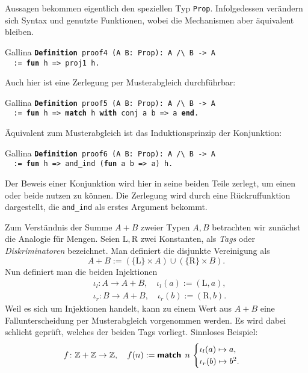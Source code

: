 \documentclass[8pt]{beamer}
\newcommand{\strong}[1]{\textsf{\textbf{#1}}}
\newcommand{\Z}{\mathbb Z}
\newcommand{\kw}[1]{\textbf{#1}}
\begin{document}
\begin{frame}
Aussagen bekommen eigentlich den speziellen Typ \texttt{Prop}.
Infolgedessen verändern sich Syntax und genutzte Funktionen,
wobei die Mechanismen aber äquivalent bleiben.
\begin{block}{Gallina}
\texttt{\kw{Definition} proof4 (A B: Prop): A /{\textbackslash} B -> A\\
\ \ := \kw{fun} h => proj1 h.}
\end{block}\pause
Auch hier ist eine Zerlegung per Musterabgleich durchführbar:
\begin{block}{Gallina}
\texttt{\kw{Definition} proof5 (A B: Prop): A /{\textbackslash} B -> A\\
\ \ := \kw{fun} h => \kw{match} h \kw{with} conj a b => a \kw{end}.}
\end{block}\pause
Äquivalent zum Musterabgleich ist das Induktionsprinzip der Konjunktion:
\begin{block}{Gallina}
\texttt{\kw{Definition} proof6 (A B: Prop): A /{\textbackslash} B -> A\\
\ \ := \kw{fun} h => and\_ind (\kw{fun} a b => a) h.}
\end{block}
Der Beweis einer Konjunktion wird hier in seine beiden Teile zerlegt,
um einen oder beide nutzen zu können. Die Zerlegung wird durch eine
Rückruffunktion dargestellt, die \texttt{and\_ind} als erstes Argument
bekommt.
\end{frame}

\begin{frame}
Zum Verständnis der Summe $A+B$ zweier Typen $A,B$ betrachten wir
zunächst die Analogie für Mengen. Seien $\mathrm L,\mathrm R$
zwei Konstanten, als \emph{Tags} oder \emph{Diskriminatoren} bezeichnet.
Man definiert die disjunkte Vereinigung als
\[A+B := (\{\mathrm L\}\times A)\cup (\{\mathrm R\}\times B).\]\pause
Nun definiert man die beiden Injektionen
\begin{align*}
&\iota_l\colon A\to A+B,\quad\iota_l(a) := (\mathrm L, a),\\
&\iota_r\colon B\to A+B,\quad\iota_r(b) := (\mathrm R, b).
\end{align*}
Weil es sich um Injektionen handelt, kann zu einem Wert aus $A+B$
eine Fallunterscheidung per Musterabgleich vorgenommen werden.
Es wird dabei schlicht geprüft, welches der beiden Tags vorliegt.\pause{}
Sinnloses Beispiel:
\[f\colon\Z+\Z\to\Z,\quad f(n) := \strong{match}\;\,n\,\begin{cases}
\iota_l(a)\mapsto a,\\
\iota_r(b)\mapsto b^2.
\end{cases}\]
\end{frame}
\end{document}
